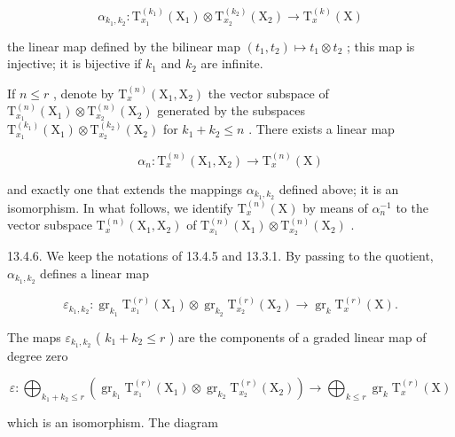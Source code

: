 \[
\alpha_ {k _ {1}, k _ {2}} \colon \mathrm{T} _ {x _ {1}} ^ {(k _ {1})} (\mathrm{X} _ {1}) \otimes \mathrm{T} _ {x _ {2}} ^ {(k _ {2})} (\mathrm{X} _ {2}) \rightarrow \mathrm{T} _ {x} ^ {(k)} (\mathrm{X})
\]

the linear map defined by the bilinear map \((t_{1}, t_{2}) \mapsto t_{1} \otimes t_{2}\) ; this map is injective; it is bijective if \(k_{1}\) and \(k_{2}\) are infinite.

If \(n \leqslant r\) , denote by \(\mathrm{T}_{x}^{(n)}(\mathrm{X}_{1}, \mathrm{X}_{2})\) the vector subspace of \(\mathrm{T}_{x_{1}}^{(n)}(\mathrm{X}_{1}) \otimes \mathrm{T}_{x_{2}}^{(n)}(\mathrm{X}_{2})\) generated by the subspaces \(\mathrm{T}_{x_{1}}^{(k_{1})}(\mathrm{X}_{1}) \otimes \mathrm{T}_{x_{2}}^{(k_{2})}(\mathrm{X}_{2})\) for \(k_{1} + k_{2} \leqslant n\) . There exists a linear map

\[
\alpha_ {n} \colon \mathrm{T} _ {x} ^ {(n)} (\mathrm{X} _ {1}, \mathrm{X} _ {2}) \rightarrow \mathrm{T} _ {x} ^ {(n)} (\mathrm{X})
\]

and exactly one that extends the mappings \(\alpha_{k_1,k_2}\) defined above; it is an isomorphism. In what follows, we identify \(\mathrm{T}_x^{(n)}(\mathrm{X})\) by means of \(\alpha_n^{-1}\) to the vector subspace \(\mathrm{T}_x^{(n)}(\mathrm{X}_1,\mathrm{X}_2)\) of \(\mathrm{T}_{x_1}^{(n)}(\mathrm{X}_1)\otimes \mathrm{T}_{x_2}^{(n)}(\mathrm{X}_2)\) .

13.4.6. We keep the notations of 13.4.5 and 13.3.1. By passing to the quotient, \(\alpha_{k_1,k_2}\) defines a linear map

\[
\varepsilon_ {k _ {1}, k _ {2}} \colon \operatorname{gr} _ {k _ {1}} \mathrm{T} _ {x _ {1}} ^ {(r)} (\mathrm{X} _ {1}) \otimes \operatorname{gr} _ {k _ {2}} \mathrm{T} _ {x _ {2}} ^ {(r)} (\mathrm{X} _ {2}) \rightarrow \operatorname{gr} _ {k} \mathrm{T} _ {x} ^ {(r)} (\mathrm{X}).
\]

The maps \(\varepsilon_{k_1,k_2}\) ( \(k_1 + k_2 \leqslant r\) ) are the components of a graded linear map of degree zero

\[
\varepsilon : \bigoplus_ {k _ {1} + k _ {2} \leqslant r} \left(\operatorname{gr} _ {k _ {1}} \mathrm{T} _ {x _ {1}} ^ {(r)} (\mathrm{X} _ {1}) \otimes \operatorname{gr} _ {k _ {2}} \mathrm{T} _ {x _ {2}} ^ {(r)} (\mathrm{X} _ {2})\right)\rightarrow \bigoplus_ {k \leqslant r} \operatorname{gr} _ {k} \mathrm{T} _ {x} ^ {(r)} (\mathrm{X})
\]

which is an isomorphism. The diagram

